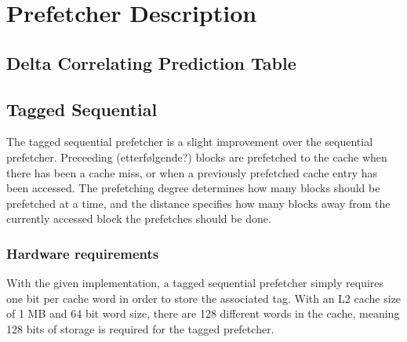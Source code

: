 \section{Prefetcher Description}


\subsection{Delta Correlating Prediction Table}

\subsection{Tagged Sequential}

The tagged sequential prefetcher is a slight improvement over the sequential
prefetcher. Preceeding (etterfølgende?) blocks are prefetched to the cache when
there has been a cache miss, or when a previously prefetched cache entry has
been accessed. The prefetching degree
determines how many blocks should be prefetched at a time, and the distance
specifies how many blocks away from the currently accessed block the prefetches
should be done.

\subsubsection{Hardware requirements}

With the given implementation, a tagged sequential prefetcher simply requires
one bit per cache word in order to store the associated tag. With an L2 cache
size of 1 MB and 64 bit word size, there are 128 different words in the cache,
meaning 128 bits of storage is required for the tagged prefetcher.
